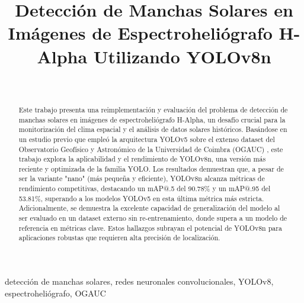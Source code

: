 \documentclass[journal]{IEEEtran}
\begin{document}
\title{Detección de Manchas Solares en Imágenes de Espectroheliógrafo H-Alpha Utilizando YOLOv8n}


\author{
     \\
}

\maketitle

\begin{abstract}
Este trabajo presenta una reimplementación y evaluación del problema de detección de manchas solares en imágenes de espectroheliógrafo H-Alpha, un desafío crucial
para la monitorización del clima espacial y el análisis de datos solares históricos. Basándose en un estudio previo que empleó la arquitectura YOLOv5 sobre el extenso dataset del Observatorio Geofísico y Astronómico de la Universidad de Coimbra (OGAUC) \cite{Santos2023}, este trabajo explora la aplicabilidad y el rendimiento de YOLOv8n, una versión más reciente y optimizada de la familia YOLO. Los resultados demuestran que, a pesar de ser la variante "nano" (más pequeña y eficiente), YOLOv8n alcanza métricas de rendimiento competitivas, destacando un mAP@.5 del 90.78\% y un mAP@.95 del 53.81\%, superando a los modelos YOLOv5 en esta última métrica más estricta. Adicionalmente, se demuestra la excelente capacidad de generalización del modelo al ser evaluado en un dataset externo sin re-entrenamiento, donde supera a un modelo de referencia en métricas clave. Estos hallazgos subrayan el potencial de YOLOv8n para aplicaciones robustas que requieren alta precisión de localización.
\end{abstract}

\begin{IEEEkeywords}
detección de manchas solares, redes neuronales convolucionales, YOLOv8, espectroheliógrafo, OGAUC
\end{IEEEkeywords}
\end{document}
